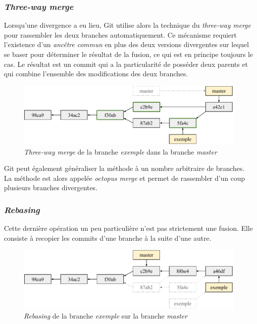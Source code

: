 \documentclass[11pt,a4paper]{article}
\begin{document}
\subsubsection{\textit{Three-way merge}}

Lorsqu'une divergence a eu lieu, Git utilise alors la technique du \textit{three-way merge} pour rassembler les deux branches automatiquement. 
Ce mécanisme requiert l'existence d'un \textit{ancêtre commun} en plus des deux versions divergentes sur lequel se baser pour déterminer le résultat de la fusion, ce qui est en principe toujours le cas. 
Le résultat est un commit qui a la particularité de posséder deux parents et qui combine l'ensemble des modifications des deux branches.

\begin{figure}[ht]
\begin{center}
\includegraphics[width=13cm]{img_twmerge}
\caption{\textit{Three-way merge} de la branche \textit{exemple} dans la branche \textit{master}}
\end{center}
\end{figure}

Git peut également généraliser la méthode à un nombre arbitraire de branches. La méthode est alors appelée \textit{octopus merge} et permet de rassembler d'un coup plusieurs branches divergentes.

\subsubsection{\textit{Rebasing}}

Cette dernière opération un peu particulière n'est pas strictement une fusion. Elle consiste à recopier les commits d'une branche à la suite d'une autre.

\begin{figure}[ht]
\begin{center}
\includegraphics[width=13cm]{img_rebase}
\caption{\textit{Rebasing} de la branche \textit{exemple} sur la branche \textit{master}}
\end{center}
\end{figure}
\end{document}
